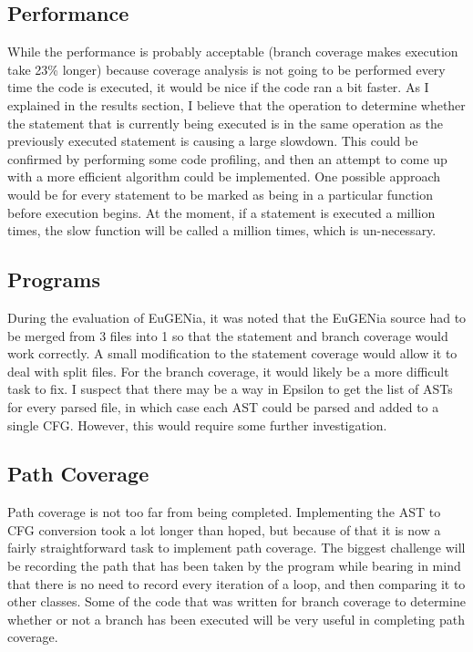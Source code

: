 \subsection{Performance}

While the performance is probably acceptable (branch coverage makes execution take 23\% longer) because coverage analysis is not going to be performed every time the code is executed, it would be nice if the code ran a bit faster. As I explained in the results section, I believe that the operation to determine whether the statement that is currently being executed is in the same operation as the previously executed statement is causing a large slowdown. This could be confirmed by performing some code profiling, and then an attempt to come up with a more efficient algorithm could be implemented. One possible approach would be for every statement to be marked as being in a particular function before execution begins. At the moment, if a statement is executed a million times, the slow function will be called a million times, which is un-necessary.

\subsection{Programs}

During the evaluation of EuGENia, it was noted that the EuGENia source had to be merged from 3 files into 1 so that the statement and branch coverage would work correctly. A small modification to the statement coverage would allow it to deal with split files. For the branch coverage, it would likely be a more difficult task to fix. I suspect that there may be a way in Epsilon to get the list of ASTs for every parsed file, in which case each AST could be parsed and added to a single CFG. However, this would require some further investigation.

\subsection{Path Coverage}

Path coverage is not too far from being completed. Implementing the AST to CFG conversion took a lot longer than hoped, but because of that it is now a fairly straightforward task to implement path coverage. The biggest challenge will be recording the path that has been taken by the program while bearing in mind that there is no need to record every iteration of a loop, and then comparing it to other classes. Some of the code that was written for branch coverage to determine whether or not a branch has been executed will be very useful in completing path coverage.